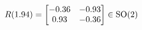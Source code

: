 \documentclass[preview]{standalone}
\begin{document}
\begin{align*}
\special{dvisvgm:raw <g id='unique000'>}R(1.94) = \begin{bmatrix} -0.36 & -0.93 \\ 0.93 & -0.36 \end{bmatrix} \in \text{SO}(2)\special{dvisvgm:raw </g>}
\end{align*}
\end{document}

